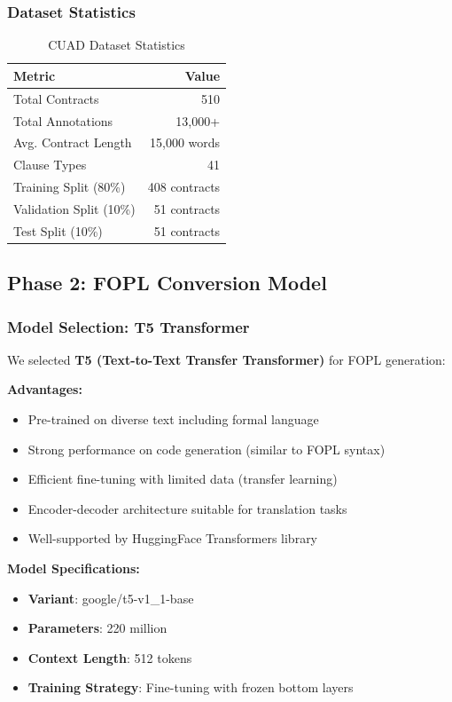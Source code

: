 \documentclass[12pt,a4paper]{article}
\begin{document}
\subsubsection{Dataset Statistics}

\begin{table}[H]
\centering
\begin{tabular}{|l|r|}
\hline
\textbf{Metric} & \textbf{Value} \\
\hline
Total Contracts & 510 \\
Total Annotations & 13,000+ \\
Avg. Contract Length & 15,000 words \\
Clause Types & 41 \\
Training Split (80\%) & 408 contracts \\
Validation Split (10\%) & 51 contracts \\
Test Split (10\%) & 51 contracts \\
\hline
\end{tabular}
\caption{CUAD Dataset Statistics}
\end{table}

\subsection{Phase 2: FOPL Conversion Model}

\subsubsection{Model Selection: T5 Transformer}

We selected \textbf{T5 (Text-to-Text Transfer Transformer)} for FOPL generation:

\textbf{Advantages:}
\begin{itemize}
    \item Pre-trained on diverse text including formal language
    \item Strong performance on code generation (similar to FOPL syntax)
    \item Efficient fine-tuning with limited data (transfer learning)
    \item Encoder-decoder architecture suitable for translation tasks
    \item Well-supported by HuggingFace Transformers library
\end{itemize}

\textbf{Model Specifications:}
\begin{itemize}
    \item \textbf{Variant}: google/t5-v1\_1-base
    \item \textbf{Parameters}: 220 million
    \item \textbf{Context Length}: 512 tokens
    \item \textbf{Training Strategy}: Fine-tuning with frozen bottom layers
\end{itemize}
\end{document}
